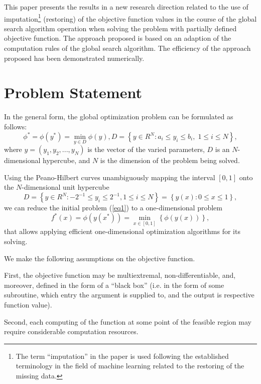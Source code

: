 \documentclass[runningheads]{llncs}
\begin{document}
This paper presents the results in a new research direction related to the use of imputation\footnote{The term ``imputation'' in the paper is used following the established terminology in the field of machine learning related to the restoring of the missing data.} (restoring) of the objective function values in the course of the global search algorithm operation when solving the problem with partially defined objective function. The approach proposed is based on an adaption of the computation rules of the global search algorithm. The efficiency of the approach proposed has been demonstrated numerically.

\section{Problem Statement}

In the general form, the global optimization problem can be formulated as follows:
\begin{equation}\label{eq1} 
\phi^*=\phi(y^* )=\min_{y \in D} \phi(y), D=\left\{ y \in R^N: a_i \leq y_i \leq b_i, \; 1 \leq i \leq N \right\},
\end{equation}
where $y=(y_1,y_2,...,y_N)$ is the vector of the varied parameters, $D$ is an $N$-dimensional hypercube, and $N$ is the dimension of the problem being solved.

Using the Peano-Hilbert curves unambiguously mapping the interval $[0,1]$ onto the $N$-dimensional unit hypercube 
$$
D=\left\{ y \in R^N: -2^{-1} \leq y_i \leq 2^{-1}, 1 \leq i \leq N \right\} = \left\{ y(x): 0 \leq x \leq 1 \right\},
$$
we can reduce the initial problem (\ref{eq1}) to a one-dimensional problem
\begin{equation}\label{eq2} 
f^*(x)=\phi(y(x^* ))=\min_{x \in [0,1]} \left\{ \phi(y(x)) \right\},
\end{equation}
that allows applying efficient one-dimensional optimization algorithms for its solving.

We make the following assumptions on the objective function. 

First, the objective function may be multiextremal, non-differentiable, and, moreover, defined in the form of a ``black box'' (i.e. in the form of some subroutine, which entry the argument is supplied to, and the output is respective function value).

Second, each computing of the function at some point of the feasible region may require considerable computation resources.
\end{document}
